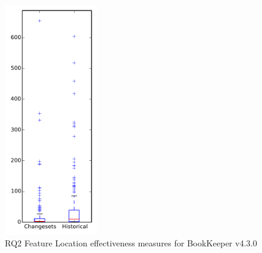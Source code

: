 
\begin{figure}[t]
\centering
\includegraphics[width=0.36\textwidth]{figures/flt/rq2_bookkeeper}
\caption{RQ2 Feature Location effectiveness measures for BookKeeper v4.3.0}
\label{fig:flt:rq2:bookkeeper}
\end{figure}
